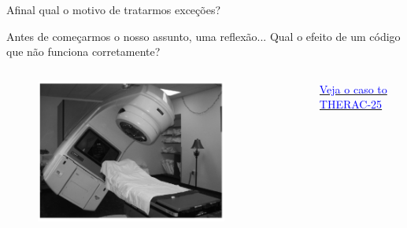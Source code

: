 \begin{frame}{Afinal qual o motivo de tratarmos exceções?}



    \begin{block}{Antes de começarmos o nosso assunto, uma reflexão...}
        Qual o efeito de um código que não funciona corretamente?
    \end{block}
    \begin{columns}
        \begin{column}{0.7\textwidth}
            \begin{figure}
                \includegraphics[width=0.8\textwidth]{Images/therac25.png}
            \end{figure}
        \end{column}

        \begin{column}{0.3\textwidth}
            \href{https://www.youtube.com/watch?v=_4VEtLsGWhY}{\textcolor{blue}{Veja o caso to THERAC-25}}
        \end{column}
    \end{columns}
\end{frame}

